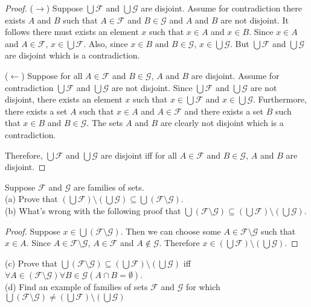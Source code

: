 \begin{proof}
    ($\rightarrow$) Suppose $\bigcup \mathcal{F}$ and $\bigcup \mathcal{G}$ are disjoint.
    Assume for contradiction there exists $A$ and $B$
    such that $A \in \mathcal{F}$ and $B \in \mathcal{G}$ and $A$ and $B$ are not disjoint.
    It follows there must exists an element $x$ such that $x \in A$ and $x \in B$.
    Since $x \in A$ and $A \in \mathcal{F}$, $x \in \bigcup \mathcal{F}$.
    Also, since $x \in B$ and $B \in \mathcal{G}$, $x \in \bigcup \mathcal{G}$.
    But $\bigcup \mathcal{F}$ and $\bigcup \mathcal{G}$ are disjoint which is a contradiction.

    ($\leftarrow$) Suppose for all $A \in \mathcal{F}$ and $B \in \mathcal{G}$, $A$ and $B$ are disjoint.
    Assume for contradiction $\bigcup \mathcal{F}$ and $\bigcup \mathcal{G}$ are not disjoint.
    Since $\bigcup \mathcal{F}$ and $\bigcup \mathcal{G}$ are not disjoint, there exists an element $x$
    such that $x \in \bigcup \mathcal{F}$ and $x \in \bigcup \mathcal{G}$. Furthermore, 
    there exists a set $A$ such that $x \in A$ and $A \in \mathcal{F}$ and there exists a set $B$
    such that $x \in B$ and $B \in \mathcal{G}$. The sets $A$ and $B$ are clearly not disjoint
    which is a contradiction.

    Therefore, $\bigcup \mathcal{F}$ and $\bigcup \mathcal{G}$ are disjoint iff for
    all $A \in \mathcal{F}$ and $B \in \mathcal{G}$, $A$ and $B$ are disjoint.
\end{proof}

\begin{tcolorbox}[title=Problem 21, breakable]
    Suppose $\mathcal{F}$ and $\mathcal{G}$ are families of sets. \\
    (a) Prove that $(\bigcup \mathcal{F}) \setminus (\bigcup \mathcal{G})
        \subseteq \bigcup(\mathcal{F} \setminus \mathcal{G})$. \\
    (b) What's wrong with the following proof that $\bigcup (\mathcal{F} \setminus \mathcal{G})
        \subseteq (\bigcup \mathcal{F}) \setminus (\bigcup \mathcal{G})$.
    \begin{proof}
        Suppose $x \in \bigcup(\mathcal{F} \setminus \mathcal{G})$. Then we can 
        choose some $A \in \mathcal{F} \setminus \mathcal{G}$ such that $x \in A$.
        Since $A \in \mathcal{F} \setminus \mathcal{G}$, $A \in \mathcal{F}$
        and $A \not \in \mathcal{G}$. Therefore $x \in (\bigcup \mathcal{F}) \setminus (\bigcup \mathcal{G})$.
    \end{proof}
    (c) Prove that $\bigcup (\mathcal{F} \setminus \mathcal{G}) \subseteq (\bigcup \mathcal{F}) \setminus (\bigcup \mathcal{G})$
    iff $\forall{A} \in (\mathcal{F} \setminus \mathcal{G})\forall{B} \in \mathcal{G}(A \cap B = \emptyset)$. \\
    (d) Find an example of families of sets $\mathcal{F}$ and $\mathcal{G}$ for which 
    $\bigcup(\mathcal{F} \setminus \mathcal{G}) \not = (\bigcup \mathcal{F}) \setminus (\bigcup \mathcal{G})$
\end{tcolorbox}

